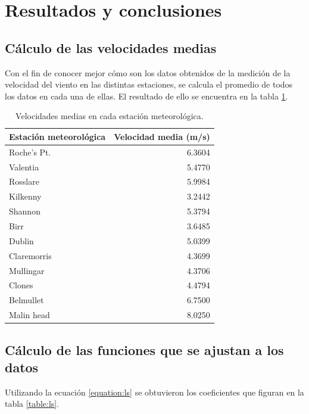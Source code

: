 \documentclass[journal, monochrome]{IEEEtran}
\begin{document}
\section{Resultados y conclusiones}
\label{section:results}
\vspace{0.5cm}
\subsection{Cálculo de las velocidades medias}
\par
Con el fin de conocer mejor cómo son los datos obtenidos de la medición de la velocidad del viento en las distintas estaciones, se calcula el promedio de todos los datos en cada una de ellas. El resultado de ello se encuentra en la tabla \ref{table:speed}.

\begin{table}
	\begin{center}
		\begin{tabular}{l|r}
			Estación meteorológica & Velocidad media (m/s) \\
			\hline
			Roche's Pt. & 6.3604 \\ 
			Valentia & 5.4770 \\
			Rosslare & 5.9984 \\
			Kilkenny & 3.2442 \\
			Shannon & 5.3794 \\
			Birr & 3.6485 \\
			Dublin & 5.0399 \\
			Claremorris & 4.3699 \\
			Mullingar & 4.3706 \\
			Clones & 4.4794 \\
			Belmullet & 6.7500 \\
			Malin head & 8.0250 \\
		\end{tabular}
		\caption{Velocidades medias en cada estación meteorológica.}
		\label{table:speed}
	\end{center}
\end{table}

\vspace{0.5cm}
\subsection{Cálculo de las funciones que se ajustan a los datos}
\par
Utilizando la ecuación \ref{equation:ls} se obtuvieron los coeficientes que figuran en la tabla \ref{table:ls}.
\end{document}

